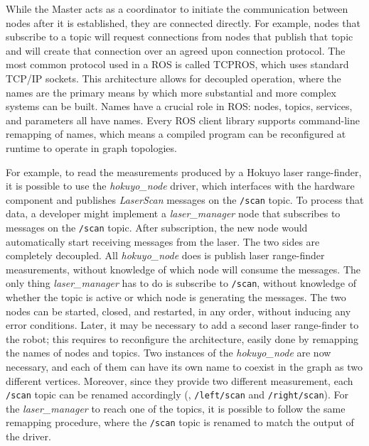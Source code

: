 While the Master acts as a coordinator to initiate the communication between nodes after it is established, they are connected directly. For example, nodes that subscribe to a topic will request connections from nodes that publish that topic and will create that connection over an agreed upon connection protocol. The most common protocol used in a ROS is called TCPROS, which uses standard TCP/IP sockets. This architecture allows for decoupled operation, where the names are the primary means by which more substantial and more complex systems can be built. Names have a crucial role in ROS: nodes, topics, services, and parameters all have names. Every ROS client library supports command-line remapping of names, which means a compiled program can be reconfigured at runtime to operate in graph topologies.

For example, to read the measurements produced by a Hokuyo laser range-finder, it is possible to use the \textit{hokuyo\_node} driver, which interfaces with the hardware component and publishes \textit{LaserScan} messages on the \texttt{/scan} topic. To process that data, a developer might implement a \textit{laser\_manager} node that subscribes to messages on the \texttt{/scan} topic. After subscription, the new node would automatically start receiving messages from the laser. The two sides are completely decoupled. All \textit{hokuyo\_node} does is publish laser range-finder measurements, without knowledge of which node will consume the messages. The only thing \textit{laser\_ma\-na\-ger} has to do is subscribe to \texttt{/scan}, without knowledge of whether the topic is active or which node is generating the messages. The two nodes can be started, closed, and restarted, in any order, without inducing any error conditions. Later, it may be necessary to add a second laser range-finder to the robot; this requires to reconfigure the architecture, easily done by remapping the names of nodes and topics. Two instances of the \textit{hokuyo\_node} are now necessary, and each of them can have its own name to coexist in the graph as two different vertices. Moreover, since they provide two different measurement, each \texttt{/scan} topic can be renamed accordingly (\eg, \texttt{/left/scan} and \texttt{/right/scan}). For the \textit{laser\_manager} to reach one of the topics, it is possible to follow the same remapping procedure, where the \texttt{/scan} topic is renamed to match the output of the driver.

